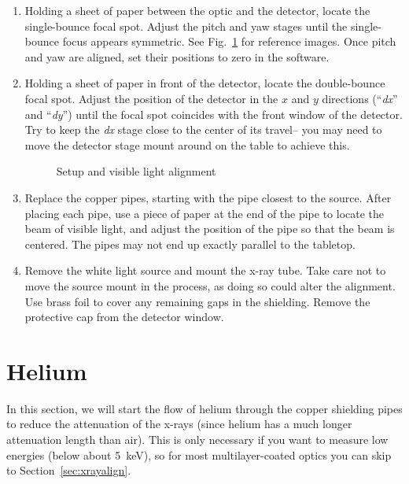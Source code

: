 \begin{enumerate}
\item Holding a sheet of paper between the optic and the detector, locate the
  single-bounce focal spot. Adjust the pitch and yaw stages until the
  single-bounce focus appears symmetric. See Fig.~\ref{fig:vis_align} for
  reference images. Once pitch and yaw are aligned, set their positions to zero
  in the software.

\item Holding a sheet of paper in front of the detector, locate the
  double-bounce focal spot. Adjust the position of the detector in the $x$ and
  $y$ directions (``\textit{dx}'' and ``\textit{dy}'') until the focal spot
  coincides with the front window of the detector. Try to keep the \textit{dx}
  stage close to the center of its travel-- you may need to move the detector
  stage mount around on the table to achieve this.

\begin{figure}
\caption{\label{fig:vis_align} Setup and visible light alignment}
\end{figure}

\item Replace the copper pipes, starting with the pipe closest to the
  source. After placing each pipe, use a piece of paper at the end of the pipe
  to locate the beam of visible light, and adjust the position of the pipe so
  that the beam is centered. The pipes may not end up exactly parallel to the
  tabletop.

\item Remove the white light source and mount the x-ray tube. Take care not to
  move the source mount in the process, as doing so could alter the
  alignment. Use brass foil to cover any remaining gaps in the shielding. Remove
  the protective cap from the detector window.

\end{enumerate}


\section{Helium\label{sec:he}}

In this section, we will start the flow of helium through the copper shielding
pipes to reduce the attenuation of the x-rays (since helium has a much longer
attenuation length than air). This is only necessary if you want to measure low
energies (below about 5~keV), so for most multilayer-coated optics you can skip
to Section~\ref{sec:xrayalign}.

